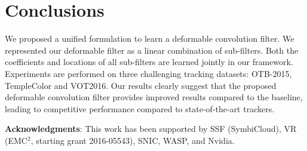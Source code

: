 \documentclass[runningheads,a4paper]{llncs}
\begin{document}
\begin{table}[!t]
  \caption{State-of-the-art in terms of expected area overlap (EAO), robustness (failure rate), and accuracy on the VOT2016 dataset. The proposed approach show a slight decrease in EAO but a slight improvement to failure rate.}
  \label{table:vot}
  \vspace{-0.35cm}
\end{table}\section{Conclusions}
We proposed a unified formulation to learn a deformable convolution filter. We represented our deformable filter as a linear combination of sub-filters. Both the coefficients and locations of all sub-filters are learned jointly in our framework. Experiments are performed on three challenging tracking datasets: OTB-2015, TempleColor and VOT2016. Our results clearly suggest that the proposed deformable convolution filter provides improved results compared to the baseline, leading to competitive performance compared to state-of-the-art trackers.

\noindent\textbf{Acknowledgments}:
This work has been supported by SSF (SymbiCloud), VR (EMC${}^2$, starting grant 2016-05543), SNIC, WASP, and Nvidia.





\end{document}
